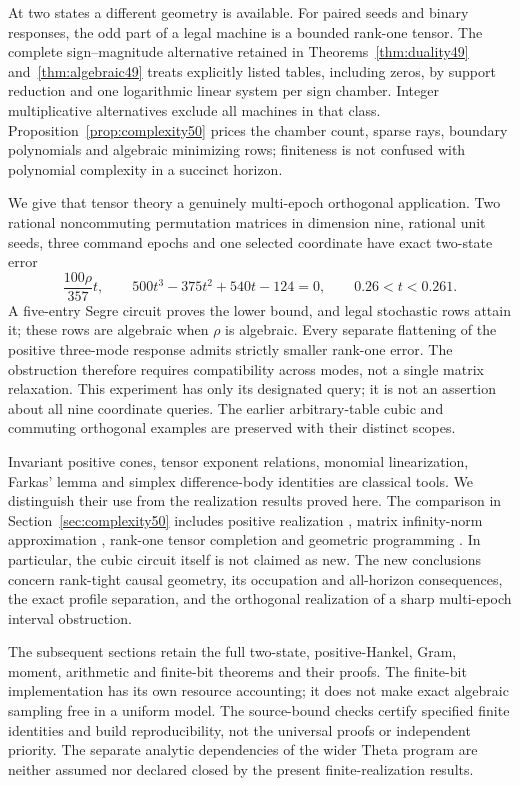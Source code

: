 At two states a different geometry is available. For paired seeds and
binary responses, the odd part of a legal machine is a bounded
rank-one tensor. The complete sign--magnitude alternative retained in
Theorems~\ref{thm:duality49} and~\ref{thm:algebraic49} treats explicitly
listed tables, including zeros, by support reduction and one logarithmic
linear system per sign chamber. Integer multiplicative alternatives
exclude all machines in that class. Proposition~\ref{prop:complexity50}
prices the chamber count, sparse rays, boundary polynomials and
algebraic minimizing rows; finiteness is not confused with polynomial
complexity in a succinct horizon.

We give that tensor theory a genuinely multi-epoch orthogonal
application. Two rational noncommuting permutation matrices in dimension
nine, rational unit seeds, three command epochs and one selected
coordinate have exact two-state error
\[
 \frac{100\rho}{357}t,\qquad
 500t^3-375t^2+540t-124=0,\qquad 0.26<t<0.261.
\]
A five-entry Segre circuit proves the lower bound, and legal stochastic
rows attain it; these rows are algebraic when $\rho$ is algebraic. Every separate flattening of the positive
three-mode response admits strictly smaller rank-one error. The
obstruction therefore requires compatibility across modes, not a
single matrix relaxation. This experiment has only its designated
query; it is not an assertion about all nine coordinate queries.
The earlier arbitrary-table cubic and commuting orthogonal examples
are preserved with their distinct scopes.

Invariant positive cones, tensor exponent relations, monomial
linearization, Farkas' lemma and simplex difference-body identities are
classical tools. We distinguish their use from the realization results
proved here. The comparison in Section~\ref{sec:complexity50} includes
positive realization \cite{BF04}, matrix infinity-norm approximation
\cite{GS19}, rank-one tensor completion \cite{KKKR17} and geometric
programming \cite{BKVH07}. In particular, the cubic circuit itself is
not claimed as new. The new conclusions concern rank-tight causal
geometry, its occupation and all-horizon consequences, the exact
profile separation, and the orthogonal realization of a sharp
multi-epoch interval obstruction.

The subsequent sections retain the full two-state, positive-Hankel,
Gram, moment, arithmetic and finite-bit theorems and their proofs.
The finite-bit implementation has its own resource accounting; it
does not make exact algebraic sampling free in a uniform model.
The source-bound checks certify specified finite identities and
build reproducibility, not the universal proofs or independent
priority. The separate analytic dependencies of the wider Theta
program are neither assumed nor declared closed by the present
finite-realization results.

